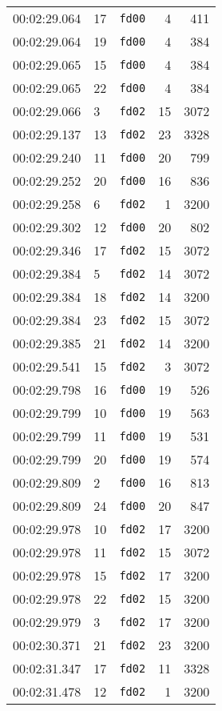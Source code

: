\documentclass{article}
\begin{document}
\begin{longtable}{lllrr}
00:02:29.064 & 17 & \texttt{fd00} & 4 & 411 \\
00:02:29.064 & 19 & \texttt{fd00} & 4 & 384 \\
00:02:29.065 & 15 & \texttt{fd00} & 4 & 384 \\
00:02:29.065 & 22 & \texttt{fd00} & 4 & 384 \\
00:02:29.066 & 3 & \texttt{fd02} & 15 & 3072 \\
00:02:29.137 & 13 & \texttt{fd02} & 23 & 3328 \\
00:02:29.240 & 11 & \texttt{fd00} & 20 & 799 \\
00:02:29.252 & 20 & \texttt{fd00} & 16 & 836 \\
00:02:29.258 & 6 & \texttt{fd02} & 1 & 3200 \\
00:02:29.302 & 12 & \texttt{fd00} & 20 & 802 \\
00:02:29.346 & 17 & \texttt{fd02} & 15 & 3072 \\
00:02:29.384 & 5 & \texttt{fd02} & 14 & 3072 \\
00:02:29.384 & 18 & \texttt{fd02} & 14 & 3200 \\
00:02:29.384 & 23 & \texttt{fd02} & 15 & 3072 \\
00:02:29.385 & 21 & \texttt{fd02} & 14 & 3200 \\
00:02:29.541 & 15 & \texttt{fd02} & 3 & 3072 \\
00:02:29.798 & 16 & \texttt{fd00} & 19 & 526 \\
00:02:29.799 & 10 & \texttt{fd00} & 19 & 563 \\
00:02:29.799 & 11 & \texttt{fd00} & 19 & 531 \\
00:02:29.799 & 20 & \texttt{fd00} & 19 & 574 \\
00:02:29.809 & 2 & \texttt{fd00} & 16 & 813 \\
00:02:29.809 & 24 & \texttt{fd00} & 20 & 847 \\
00:02:29.978 & 10 & \texttt{fd02} & 17 & 3200 \\
00:02:29.978 & 11 & \texttt{fd02} & 15 & 3072 \\
00:02:29.978 & 15 & \texttt{fd02} & 17 & 3200 \\
00:02:29.978 & 22 & \texttt{fd02} & 15 & 3200 \\
00:02:29.979 & 3 & \texttt{fd02} & 17 & 3200 \\
00:02:30.371 & 21 & \texttt{fd02} & 23 & 3200 \\
00:02:31.347 & 17 & \texttt{fd02} & 11 & 3328 \\
00:02:31.478 & 12 & \texttt{fd02} & 1 & 3200 \\

\end{longtable}
\end{document}
